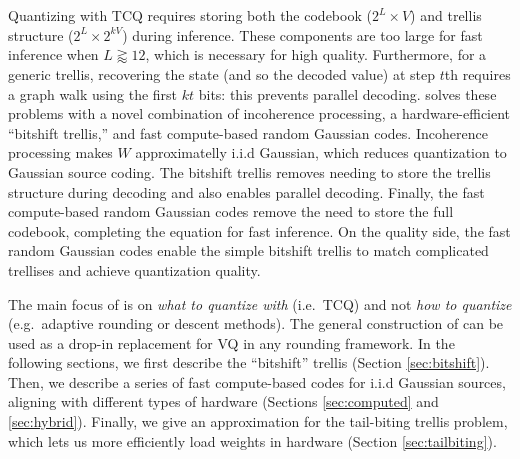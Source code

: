 \section{\qt}
\label{sec:qtip}



Quantizing with TCQ requires storing both the codebook ($2^L \times V$) and trellis structure ($2^L \times 2^{kV}$) during inference. 
These components are too large for fast inference when $L \gtrapprox 12$, which is necessary for high quality. 
Furthermore, for a generic trellis, recovering the state (and so the decoded value) at step $t$th requires a graph walk using the first $kt$ bits: this prevents parallel decoding. %
\qts solves these problems with a novel combination of incoherence processing, a hardware-efficient ``bitshift trellis,'' and fast compute-based random Gaussian codes.
Incoherence processing makes $W$ approximatelly i.i.d Gaussian, which reduces quantization to Gaussian source coding.
The bitshift trellis removes needing to store the trellis structure during decoding and also enables parallel decoding.
Finally, the fast compute-based random Gaussian codes remove the need to store the full codebook, completing the equation for fast inference.
On the quality side, the fast random Gaussian codes enable the simple bitshift trellis to match complicated trellises and achieve \sota quantization quality.

The main focus of \qts is on \textit{what to quantize with} (i.e.\ TCQ) and not \textit{how to quantize} (e.g.\ adaptive rounding or descent methods).
The general construction of \qts can be used as a drop-in replacement for VQ in any rounding framework.
In the following sections, we first describe the ``bitshift'' trellis (Section \ref{sec:bitshift}). 
Then, we describe a series of fast compute-based codes for i.i.d Gaussian sources, aligning with different types of hardware (Sections \ref{sec:computed} and \ref{sec:hybrid}).
Finally, we give an approximation for the tail-biting trellis problem, which lets us more efficiently load weights in hardware (Section \ref{sec:tailbiting}).



